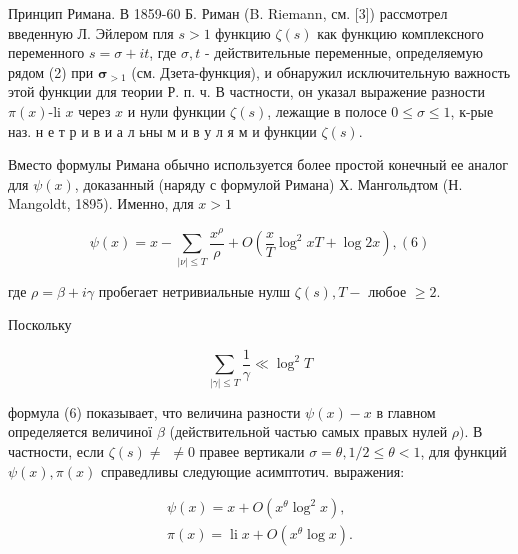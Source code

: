 \documentclass[10pt]{article}
\begin{document}
Принцип Римана. В 1859-60 Б. Риман (B. Riemann, см. [3]) рассмотрел введенную Л. Эйлером пля $s>1$ функцию $\zeta(s)$ как функцию комплексного переменного $s=\sigma+i t$, где $\sigma, t$ - действительные переменные, определяемую рядом (2) при $\boldsymbol{\sigma}_{>1}$ (см. Дзета-функция), и обнаружил исключительную важность этой функции для теории Р. п. ч. В частности, он указал выражение разности $\pi(x)$-li $x$ через $x$ и нули функции $\zeta(s)$, лежащие в полосе $0 \leqslant \sigma \leqslant 1$, к-рые наз. н е т р и в и а л ьны м и в у л я м и функции $\zeta(s)$.



Вместо формулы Римана обычно используется более простой конечный ее аналог для $\psi(x)$, доказанный (наряду с формулой Римана) Х. Мангольдтом (Н. Mangoldt, 1895). Именно, для $x>1$



\[

\psi(x)=x-\sum_{|\nu| \leqslant T} \frac{x^{\rho}}{\rho}+O\left(\frac{x}{T} \log ^{2} x T+\log 2 x\right),(6)

\]



где $\rho=\beta+i \gamma$ пробегает нетривиальные нулш $\zeta(s), T-$ любое $\geqslant 2$.



Поскольку



\[

\sum_{|\gamma| \leqslant T} \frac{1}{\gamma} \ll \log ^{2} T

\]



формула (6) показывает, что величина разности $\psi(x)-x$ в главном определяется величиної $\beta$ (действительной частью самых правых нулей $\rho)$. В частности, если $\zeta(s) \neq$ $\neq 0$ правее вертикали $\sigma=\theta, 1 / 2 \leqslant \theta<1$, для функций $\psi(x), \pi(x)$ справедливы следующие асимптотич. выражения:



\[

\begin{gathered}

\psi(x)=x+O\left(x^{\theta} \log ^{2} x\right), \\

\pi(x)=\operatorname{li} x+O\left(x^{\theta} \log x\right) .

\end{gathered}

\]
\end{document}
